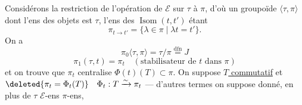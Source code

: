
Considérons la restriction de l'opération de $\mathcal E$ sur $\tau$ à $\pi$, d'où un groupoïde $\langle\tau,\pi\rangle$ dont l'ens des objets est $\tau$, l'ens des $\operatorname{Isom}(t,t')$ étant
\[
\pi_{t\to t'}=\{\lambda\in\pi\mid\lambda t=t'\}.
\]
 On a
\[
\pi_0\langle\tau,\pi\rangle=\tau/\pi\overset{\mathrm{dfn}}=J
\]
\[
\pi_1(\tau,t)=\pi_t\quad(\text{stabilisateur de }t\text{ dans }\pi)
\]
et on trouve que $\pi_t$ centralise $\Phi(t)(T)\subset\pi$. On suppose \uline{$T$ commutatif} et $\deleted{\pi_t=\Phi_t(T)}\quad\Phi_t:T\xrightarrow{\sim}\pi_t$ ---  d'autres termes on suppose donné, en plus de $\tau$ $\mathcal E$-ens  $\pi$-ens,
